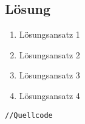 \subsection{Lösung}

\begin{enumerate}
		\item Lösungsansatz 1
		\item Lösungsansatz 2
		\item Lösungsansatz 3
		\item Lösungsansatz 4
\end{enumerate}


\begin{lstlisting}[frame=htrbl, caption={Listening Bezeichnung}, label={lst:Referenzname}]
//Quellcode
\end{lstlisting}

